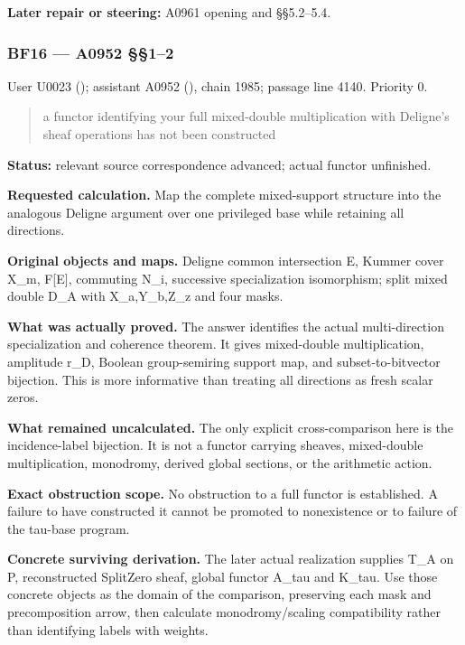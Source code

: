 \documentclass[10pt,a4paper,oneside]{report}
\begin{document}
\textbf{Later repair or steering:} A0961 opening and §§5.2--5.4.

\subsubsection{BF16 --- A0952 §§1--2}\label{bf16-a0952-12}

User U0023 (\protect{});
assistant A0952 (\protect{}),
chain 1985; passage line 4140. Priority 0.

\begin{quote}
a functor identifying your full mixed-double multiplication with
Deligne's sheaf operations has not been constructed
\end{quote}

\textbf{Status:} relevant source correspondence advanced; actual functor
unfinished.

\textbf{Requested calculation.} Map the complete mixed-support structure
into the analogous Deligne argument over one privileged base while
retaining all directions.

\textbf{Original objects and maps.} Deligne common intersection E,
Kummer cover X\_m, F{[}E{]}, commuting N\_i, successive specialization
isomorphism; split mixed double D\_A with X\_a,Y\_b,Z\_z and four masks.

\textbf{What was actually proved.} The answer identifies the actual
multi-direction specialization and coherence theorem. It gives
mixed-double multiplication, amplitude r\_D, Boolean group-semiring
support map, and subset-to-bitvector bijection. This is more informative
than treating all directions as fresh scalar zeros.

\textbf{What remained uncalculated.} The only explicit cross-comparison
here is the incidence-label bijection. It is not a functor carrying
sheaves, mixed-double multiplication, monodromy, derived global
sections, or the arithmetic action.

\textbf{Exact obstruction scope.} No obstruction to a full functor is
established. A failure to have constructed it cannot be promoted to
nonexistence or to failure of the tau-base program.

\textbf{Concrete surviving derivation.} The later actual realization
supplies T\_A on P, reconstructed SplitZero sheaf, global functor A\_tau
and K\_tau. Use those concrete objects as the domain of the comparison,
preserving each mask and precomposition arrow, then calculate
monodromy/scaling compatibility rather than identifying labels with
weights.
\end{document}
